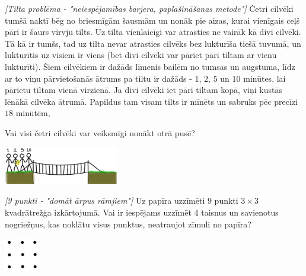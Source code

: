






\noindent 

\begin{problem}
\textit{[Tilta problēma - "neiespējamības barjera, paplašināšanas metode"]}
Četri cilvēki tumšā naktī bēg no briesmīgām šausmām un nonāk pie aizas, kurai vienīgais ceļš pāri ir šaurs virvju tilts. Uz tilta vienlaicīgi var atrasties ne vairāk kā divi cilvēki. Tā kā ir tumšs, tad uz tilta nevar atrasties cilvēks bez lukturīša tiešā tuvumā, un lukturītis uz visiem ir viens (bet divi cilvēki var pāriet pāri tiltam ar vienu lukturīti).  
Šiem cilvēkiem ir dažāds līmenis bailēm no tumsas un augstuma, līdz ar to viņu pārvietošanās ātrums pa tiltu ir dažāds - $1$, $2$, $5$ un $10$ minūtes, lai pārietu tiltam vienā virzienā. Ja divi cilvēki iet pāri tiltam kopā, viņi kustās lēnākā cilvēka ātrumā.
Papildus tam visam tilts ir mīnēts un sabruks pēc precīzi $18$ minūtēm,

Vai visi četri cilvēki var veiksmīgi nonākt otrā pusē?
\begin{center}
\includegraphics[width=5cm]{bridge.jpg}
\label{fig:bridge}
\end{center}
\end{problem}
%

\begin{problem}
\textit{[9 punkti - "domāt ārpus rāmjiem"]}
Uz papīra uzzīmēti $9$ punkti $3 \times 3$ kvadrātrežģa izkārtojumā. Vai ir iespējams uzzīmēt $4$ taisnus un savienotus nogriežņus, kas noklātu visus punktus, neatraujot zīmuli no papīra?
\begin{center}
\includegraphics[width=1.5cm]{3by3.jpg}
\label{fig:bridge}
\end{center}
\end{problem}
%

